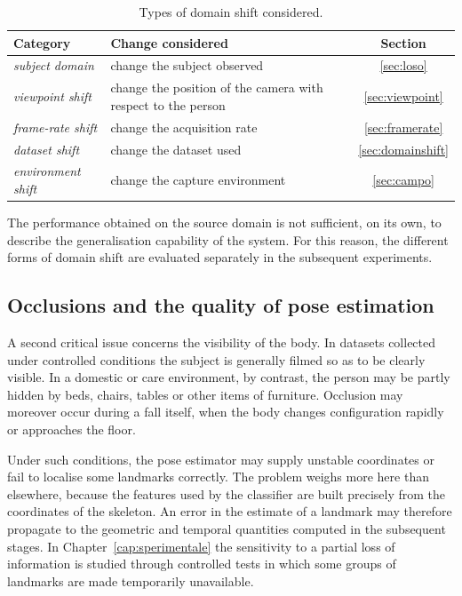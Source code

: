 \begin{table}[htbp]
\centering
\caption{Types of domain shift considered.}
\label{tab:domain_shift}

\begin{tabularx}{\textwidth}{l X c}
\toprule
\textbf{Category} &
\textbf{Change considered} &
\textbf{Section} \\
\midrule
\emph{subject domain}
& change the subject observed
& \ref{sec:loso} \\
\emph{viewpoint shift}
& change the position of the camera with respect to the person
& \ref{sec:viewpoint} \\
\emph{frame-rate shift}
& change the acquisition rate
& \ref{sec:framerate} \\
\emph{dataset shift}
& change the dataset used
& \ref{sec:domainshift} \\
\emph{environment shift}
& change the capture environment
& \ref{sec:campo} \\
\bottomrule
\end{tabularx}
\end{table}

The performance obtained on the source domain is not
sufficient, on its own, to describe the generalisation capability of the system. For this reason, the different forms of domain shift are evaluated separately in the subsequent experiments.

\subsection{Occlusions and the quality of pose estimation}

A second critical issue concerns the visibility of the body.
In datasets collected under controlled conditions the subject is generally
filmed so as to be clearly visible. In a domestic or care environment, by
contrast, the person may be partly hidden by beds, chairs, tables or other
items of furniture. Occlusion may moreover occur during a fall itself, when
the body changes configuration rapidly or approaches the floor.

Under such conditions, the pose estimator may supply unstable coordinates or
fail to localise some landmarks correctly.
The problem weighs more here than elsewhere, because the features used by the
classifier are built precisely from the coordinates of the skeleton. An error
in the estimate of a landmark may therefore propagate to the geometric and
temporal quantities computed in the subsequent stages.
In Chapter~\ref{cap:sperimentale} the sensitivity to a partial loss of
information is studied through controlled tests in which some groups of
landmarks are made temporarily unavailable.

